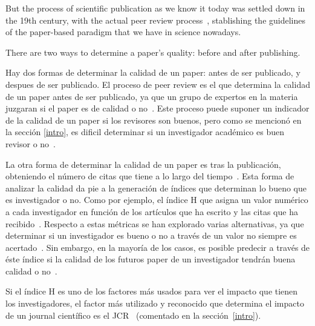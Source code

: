 
But the process of scientific publication as we know it today was settled down
in the 19th century, with the actual peer review
process~\cite{burnham1990evolution}, stablishing the  guidelines of the
paper-based paradigm that we have in science nowadays.


There are two ways to determine a paper's quality: before and after publishing.

Hay dos formas de determinar la calidad de un paper: antes de ser publicado, y
despues de ser publicado. El proceso de peer review es el que determina la
calidad de un paper antes de ser publicado, ya que un grupo de expertos en la
materia juzgaran si el paper es de calidad o no~\cite{szklo2006quality}. Este
proceso puede suponer un indicador de la calidad de un paper si los revisores
son buenos, pero como se mencionó en la sección \ref{intro}, es dificil
determinar si un investigador académico es buen revisor o
no~\cite{callaham_relationship_2007}.

La otra forma de determinar la calidad de un paper es tras la publicación,
obteniendo el número de citas que tiene a lo largo del
tiempo~\cite{redner1998popular}. Esta forma de analizar la calidad da pie a la
generación de índices que determinan lo bueno que es investigador o no. Como por
ejemplo, el índice H que asigna un valor numérico a cada investigador en función
de los artículos que ha escrito y las citas que ha
recibido~\cite{bornmann2007we}. Respecto a estas métricas se han explorado
varias alternativas, ya que determinar si un investigador es bueno o no a través
de un valor no siempre es acertado~\cite{bornmann2008there}. Sin embargo, en la
mayoría de los casos, es posible predecir a través de éste índice si la calidad
de los futuros paper de un investigador tendrán buena calidad o
no~\cite{hirsch2007does}.

Si el índice H es uno de los factores más usados para ver el impacto que tienen
los investigadores, el factor más utilizado y reconocido que determina el
impacto de un journal científico es el JCR~\cite{doi:10.1001/jama.295.1.90}
(comentado en la sección~\ref{intro}).


